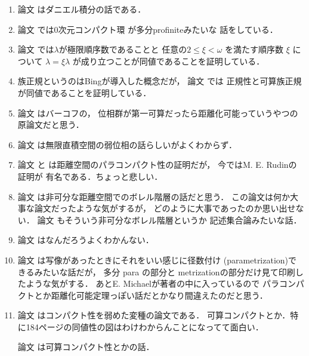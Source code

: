 \documentclass[leqno, a4paper, 12pt]{jsarticle}
\begin{document}
\begin{enumerate}[label=(\arabic*)]
\item
論文
\cite{MR0111816}
はダニエル積分の話である．

\item 
論文
\cite{MR0062730}
では0次元コンパクト環
が多分profiniteみたいな
話をしている．

\item 
論文
\cite{MR0069247}
では$\lambda$が極限順序数であることと
任意の$2\le \xi<\omega$
を満たす順序数
$\xi$
について
$\lambda=\xi\lambda$
が成り立つことが同値であることを証明している．


\item 
族正規というのはBingが導入した概念だが，
論文
\cite{MR0063018}
では
正規性と可算族正規が同値であることを証明している．


\item 
論文
\cite{MR1556955}
はバーコフの，
位相群が第一可算だったら距離化可能っていうやつの原論文だと思う．


\item 

論文
\cite{MR0029152}
は無限直積空間の弱位相の話らしいがよくわからず．

\item 
論文
\cite{MR0242120}
と
\cite{MR0233333}
は距離空間のパラコンパクト性の証明だが，
今ではM. E. Rudinの証明が
有名である．ちょっと悲しい．

\item 
論文
\cite{Montgomrey1935}
は非可分な距離空間でのボレル階層の話だと思う．
この論文は何か大事な論文だったような気がするが，
どのように大事であったのか思い出せない．
論文
\cite{MR1367597}
もそういう非可分なボレル階層というか
記述集合論みたいな話．

\item 
論文
\cite{MR1502556}
はなんだろうよくわかんない．


\item 
論文\cite{MR0808727}
は写像があったときにそれをいい感じに径数付け
(parametrization)できるみたいな話だが，
多分 para の部分と
metrizationの部分だけ見て印刷したような気がする．
あとE. Michaelが著者の中に入っているので
パラコンパクトとか距離化可能定理っぽい話だとかなり間違えたのだと思う．



\item 
論文
\cite{Mathur1971}
はコンパクト性を弱めた変種の論文である．
可算コンパクトとか．特に184ページの同値性の図はわけわからんことになってて面白い．

論文
\cite{MR0314002}
は可算コンパクト性とかの話．



\end{enumerate}
\end{document}
